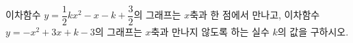 이차함수 $y=\dfrac{1}{2}kx^2-x-k+\dfrac{3}{2}$의 그래프는 $x$축과 한 점에서 만나고, 이차함수 $y=-x^2+3x+k-3$의 그래프는 $x$축과 만나지 않도록 하는 실수 $k$의 값을 구하시오.
